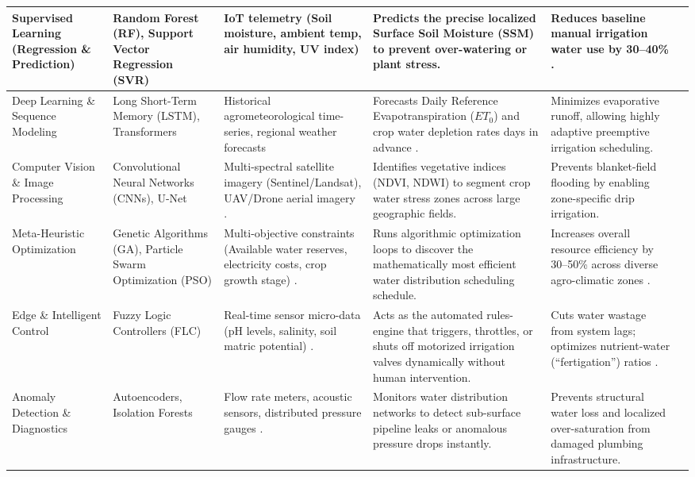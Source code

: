 \documentclass[land,article,submit,pdftex,moreauthors]{Definitions/mdpi}
\numberwithin{equation}{section}
\begin{document}
\begin{longtable}{p{2.4cm} p{2.3cm} p{2.6cm} p{2.6cm} p{2.6cm} p{2.3cm}}
Supervised Learning (Regression \& Prediction) & 
Random Forest (RF), Support Vector Regression (SVR) & 
IoT telemetry (Soil moisture, ambient temp, air humidity, UV index) & 
Predicts the precise localized Surface Soil Moisture (SSM) to prevent over-watering or plant stress. & 
Reduces baseline manual irrigation water use by 30--40\% \citep{Oguzturk2025}. \\
\midrule
Deep Learning \& Sequence Modeling & 
Long Short-Term Memory (LSTM), Transformers & 
Historical agrometeorological time-series, regional weather forecasts & 
Forecasts Daily Reference Evapotranspiration ($ET_0$) and crop water depletion rates days in advance \citep{Zhang2025}. & 
Minimizes evaporative runoff, allowing highly adaptive preemptive irrigation scheduling. \\ 
\midrule
Computer Vision \& Image Processing & 
Convolutional Neural Networks (CNNs), U-Net & 
Multi-spectral satellite imagery (Sentinel/Landsat), UAV/Drone aerial imagery \citep{Yparraguirre2026}. & 
Identifies vegetative indices (NDVI, NDWI) to segment crop water stress zones across large geographic fields. & 
Prevents blanket-field flooding by enabling zone-specific drip irrigation. \\ 
\midrule
Meta-Heuristic Optimization & 
Genetic Algorithms (GA), Particle Swarm Optimization (PSO) & 
Multi-objective constraints (Available water reserves, electricity costs, crop growth stage) \citep{Paria2025}. & 
Runs algorithmic optimization loops to discover the mathematically most efficient water distribution scheduling schedule. & 
Increases overall resource efficiency by 30--50\% across diverse agro-climatic zones \citep{Hamdouni2026}. \\ 
\midrule
Edge \& Intelligent Control & 
Fuzzy Logic Controllers (FLC) & 
Real-time sensor micro-data (pH levels, salinity, soil matric potential) \citep{Ali2025}. & 
Acts as the automated rules-engine that triggers, throttles, or shuts off motorized irrigation valves dynamically without human intervention. & 
Cuts water wastage from system lags; optimizes nutrient-water (``fertigation'') ratios \citep{Oguzturk2025}. \\ 
\midrule
Anomaly Detection \& Diagnostics & 
Autoencoders, Isolation Forests & 
Flow rate meters, acoustic sensors, distributed pressure gauges \citep{w18080919}. & 
Monitors water distribution networks to detect sub-surface pipeline leaks or anomalous pressure drops instantly. & 
Prevents structural water loss and localized over-saturation from damaged plumbing infrastructure. \\
\bottomrule
\end{longtable}
\end{document}
